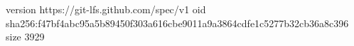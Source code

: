 version https://git-lfs.github.com/spec/v1
oid sha256:f47bf4abc95a5b89450f303a616cbe9011a9a3864cdfe1c5277b32cb36a8c396
size 3929
